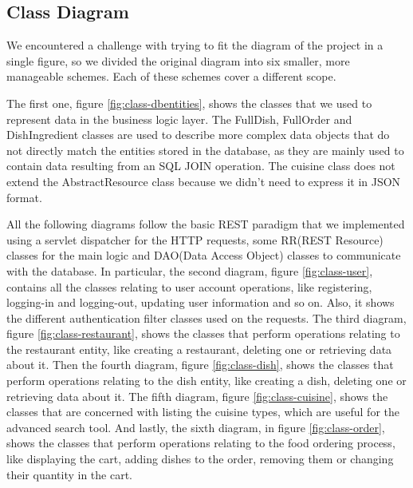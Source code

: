 \subsection{Class Diagram}
We encountered a challenge with trying to fit the diagram of the project in a single figure, so we divided the original diagram into six smaller, more manageable schemes.
Each of these schemes cover a different scope.

The first one, figure \ref{fig:class-dbentities}, shows the classes that we used to represent data in the business logic layer.
The FullDish, FullOrder and DishIngredient classes are used to describe more complex data objects that do not directly match the entities stored in the database, as they are mainly used to contain data resulting from an SQL JOIN operation.
The cuisine class does not extend the AbstractResource class because we didn't need to express it in JSON format.

All the following diagrams follow the basic REST paradigm that we implemented using a servlet dispatcher for the HTTP requests, some RR(REST Resource) classes for the main logic and DAO(Data Access Object) classes to communicate with the database.
In particular, the second diagram, figure \ref{fig:class-user}, contains all the classes relating to user account operations, like registering, logging-in and logging-out, updating user information and so on.
Also, it shows the different authentication filter classes used on the requests.
The third diagram, figure \ref{fig:class-restaurant}, shows the classes that perform operations relating to the restaurant entity, like creating a restaurant, deleting one or retrieving data about it.
Then the fourth diagram, figure \ref{fig:class-dish}, shows the classes that perform operations relating to the dish entity, like creating a dish, deleting one or retrieving data about it.
The fifth diagram, figure \ref{fig:class-cuisine}, shows the classes that are concerned with listing the cuisine types, which are useful for the advanced search tool.
And lastly, the sixth diagram, in figure \ref{fig:class-order}, shows the classes that perform operations relating to the food ordering process, like displaying the cart, adding dishes to the order, removing them or changing their quantity in the cart.



